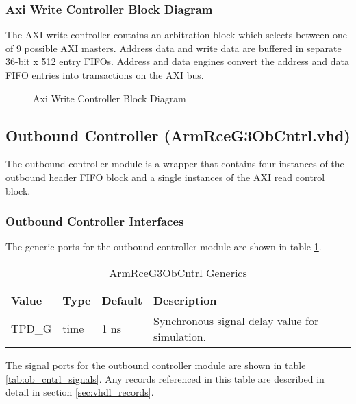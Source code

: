 \documentclass[11pt]{article}
\begin{document}
\subsubsection{Axi Write Controller Block Diagram}

The AXI write controller contains an arbitration block which selects between one of 9 possible AXI masters. Address data and write data
are buffered in separate 36-bit x 512 entry FIFOs. Address and data engines convert the address and data FIFO entries into transactions on the AXI bus.

\begin{figure}[H]
   \centering
   \caption{Axi Write Controller Block Diagram}
   \label{fig:axi_write_block}
\end{figure}

\subsection{Outbound Controller (ArmRceG3ObCntrl.vhd)}
\label{subsec:ArmRceG3ObCntrl}

The outbound controller module is a wrapper that contains four instances of the outbound header FIFO block and a single
instances of the AXI read control block. 

\subsubsection{Outbound Controller Interfaces}

The generic ports for the outbound controller module are shown in table \ref{tab:ob_cntrl_generics}.

\begin{table}[H]
\small
\centering
   \begin{tabular}{| l | l | l | l | }
      \hline \textbf{Value} & \textbf{Type} & \textbf{Default} & \textbf{Description} \\
      \hline TPD\_G          & time     & 1 ns & Synchronous signal delay value for simulation.    \\
      \hline
   \end{tabular}
   \caption{ArmRceG3ObCntrl Generics}
   \label{tab:ob_cntrl_generics}
\end{table}

The signal ports for the outbound controller module are shown in table \ref{tab:ob_cntrl_signals}.
Any records referenced in this table are described in detail in section \ref{sec:vhdl_records}. 
\end{document}
